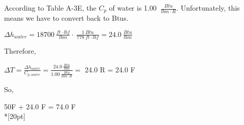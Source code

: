 \documentclass{article}
\begin{document}
According to Table A-3E, the \(C_p\) of water is 1.00 \(\displaystyle \: \frac{Btu}{lbm\cdot R}\). Unfortunately, this means we have to convert back to Btus.
\begin{center}
    \(\Delta h_{water} = 18700\:\)\(\displaystyle\frac{ft\cdot lbf}{lbm} \cdot\: \frac{1\:Btu}{778 \:ft\cdot lbf} = 24.0 \:\frac{Btu}{lbm}\)
\end{center}
Therefore, 
\begin{center}
    \(\displaystyle \Delta T = \frac{\Delta h_{water}}{C_{p, water}} = \frac{24.0\: \frac{Btu}{lbm}}{1.00 \:\frac{Btu}{lbm\cdot R}} =\) 24.0 R = 24.0 \textdegree F
\end{center}
So, 
\begin{center}
    50\textdegree F + 24.0 \textdegree F = {74.0 \textdegree F}\\*[20pt]
\end{center}
\end{document}
